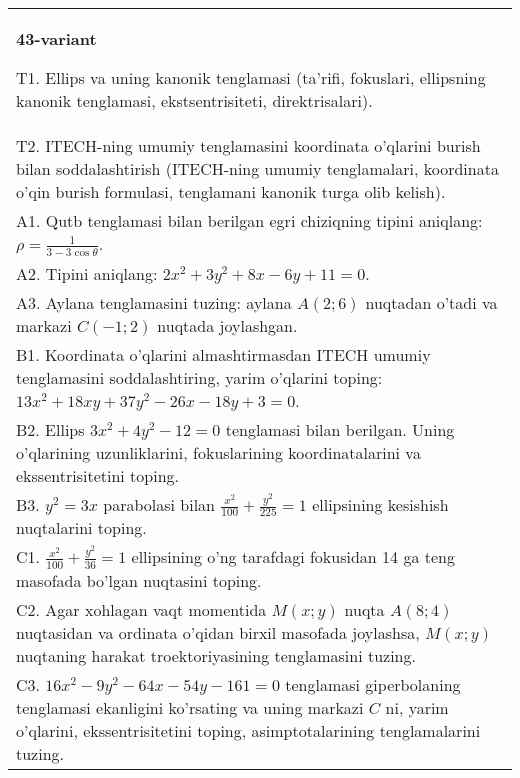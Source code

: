 \documentclass{article}
\begin{document}
\begin{tabular}{m{17cm}}
\textbf{43-variant}
\newline

T1. Ellips va uning kanonik tenglamasi (ta'rifi, fokuslari, ellipsning kanonik tenglamasi, ekstsentrisiteti, direktrisalari).\\

T2. ITECH-ning umumiy tenglamasini koordinata o'qlarini burish bilan soddalashtirish (ITECH-ning umumiy tenglamalari, koordinata o'qin burish formulasi, tenglamani kanonik turga olib kelish).\\

A1. Qutb tenglamasi bilan berilgan egri chiziqning tipini aniqlang: $\rho=\frac{1}{3-3\cos\theta}$.\\

A2. Tipini aniqlang: $2x^{2}+3y^{2}+8x-6y+11=0$.\\

A3. Aylana tenglamasini tuzing: aylana $A(2;6)$ nuqtadan o'tadi va markazi $C(-1;2)$ nuqtada joylashgan.\\

B1. Koordinata o'qlarini almashtirmasdan ITECH umumiy tenglamasini soddalashtiring, yarim o'qlarini toping: $13x^{2} + 18xy + 37y^{2} - 26x - 18y + 3 = 0$.  \\

B2. Ellips $3x^{2} + 4y^{2} - 12 = 0$ tenglamasi bilan berilgan. Uning o'qlarining uzunliklarini, fokuslarining koordinatalarini va ekssentrisitetini toping.  \\

B3. $y^{2} = 3x$ parabolasi bilan $\frac{x^{2}}{100} + \frac{y^{2}}{225} = 1$ ellipsining kesishish nuqtalarini toping.  \\

C1. $\frac{x^{2}}{100} + \frac{y^{2}}{36} = 1$ ellipsining o'ng tarafdagi fokusidan 14 ga teng masofada bo'lgan nuqtasini toping.  \\

C2. Agar xohlagan vaqt momentida $M(x;y)$ nuqta $A(8;4)$ nuqtasidan va ordinata o'qidan birxil masofada joylashsa, $M(x;y)$ nuqtaning harakat troektoriyasining tenglamasini tuzing.  \\

C3. $16x^{2} - 9y^{2} - 64x - 54y - 161 = 0$ tenglamasi giperbolaning tenglamasi ekanligini ko'rsating va uning markazi $C$ ni, yarim o'qlarini, ekssentrisitetini toping, asimptotalarining tenglamalarini tuzing.  \\

\end{tabular}
\vspace{1cm}
\end{document}
